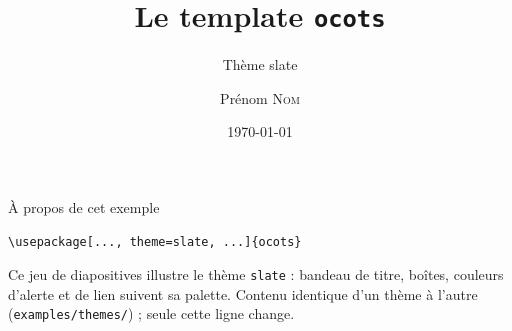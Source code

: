\documentclass[9pt,t]{beamer}
\title{Le template \texttt{ocots}}
\subtitle{Th\`eme slate}
\author{Prénom \textsc{Nom}}
\date{\today}
\begin{document}
\slidetitlepage%

\begin{frame}[fragile]{\`A propos de cet exemple}
\begin{lstlisting}
\usepackage[..., theme=slate, ...]{ocots}
\end{lstlisting}
Ce jeu de diapositives illustre le th\`eme \texttt{slate} : bandeau de
titre, bo\^ites, couleurs d'alerte et de lien suivent sa palette. Contenu
identique d'un th\`eme \`a l'autre (\texttt{examples/themes/}) ; seule
cette ligne change.
\end{frame}


\end{document}
